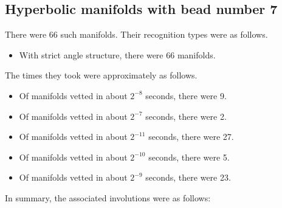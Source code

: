 \documentclass{article}
\begin{document}
\subsection{Hyperbolic manifolds with bead number 7}
There were 66 such manifolds.
Their recognition types were as follows.
\begin{itemize}
\item With strict angle structure, there were 66 manifolds.
\end{itemize}
The times they took were approximately as follows.
\begin{itemize}
\item Of manifolds vetted in about $2^{-8}$ seconds, there were 9.
\item Of manifolds vetted in about $2^{-7}$ seconds, there were 2.
\item Of manifolds vetted in about $2^{-11}$ seconds, there were 27.
\item Of manifolds vetted in about $2^{-10}$ seconds, there were 5.
\item Of manifolds vetted in about $2^{-9}$ seconds, there were 23.
\end{itemize}
In summary, the associated involutions were as follows:
\end{document}
